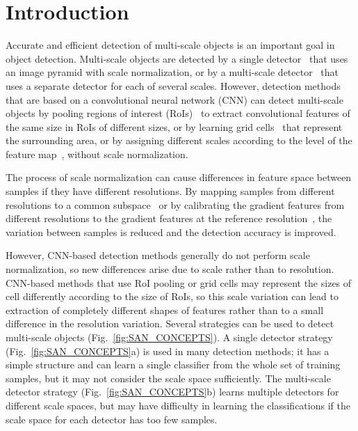 \documentclass[runningheads]{llncs}
\begin{document}
\section{Introduction}


Accurate and efficient detection of multi-scale objects is an important goal in object detection.
Multi-scale objects are detected by a single detector~\cite{dalal2005histograms,dollar2014fast,dollar2009integral,viola2004robust} that uses an image pyramid with scale normalization,
or by a multi-scale detector~\cite{benenson2012pedestrian} that uses a separate detector for each of several scales.
However, detection methods that are based on a convolutional neural network (CNN) can detect multi-scale objects by pooling regions of interest (RoIs)~\cite{girshick2015fast,li2016r,ren2015faster} to extract convolutional features of the same size in RoIs of different sizes,
or by learning grid cells~\cite{redmon2016you,redmon2017yolo9000} that represent the surrounding area, or by assigning different scales according to the level of the feature map~\cite{lin2017feature,liu2016ssd}, without scale normalization.


The process of scale normalization can cause differences in feature space between samples if they have different resolutions.
By mapping samples from different resolutions to a common subspace~\cite{yan2013robust} or by calibrating the gradient features from different resolutions to the gradient features at the reference resolution~\cite{detector2017icip},
the variation between samples is reduced and the detection accuracy is improved.


However, CNN-based detection methods generally do not perform scale normalization,
so new differences arise due to scale rather than to resolution.
CNN-based methods that use RoI pooling or grid cells may represent the sizes of cell differently according to the size of RoIs,
so this scale variation can lead to extraction of completely different shapes of features rather than to a small difference in the resolution variation.
Several strategies can be used to detect multi-scale objects (Fig.~\ref{fig:SAN_CONCEPTS}).
A single detector strategy (Fig.~\ref{fig:SAN_CONCEPTS}a) is used in many detection methods; it has a simple structure and can learn a single classifier from the whole set of training samples,
but it may not consider the scale space sufficiently.
The multi-scale detector strategy (Fig.~\ref{fig:SAN_CONCEPTS}b) learns multiple detectors for different scale spaces,
but may have difficulty in learning the classifications if the scale space for each detector has too few samples.
\end{document}

